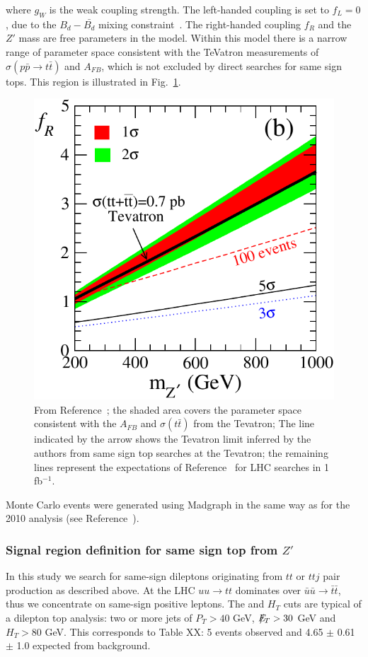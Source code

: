 where $g_W$ is the weak coupling strength. The left-handed coupling is set to $f_L = 0$, due 
to the $B_d-\bar{B_d}$ mixing constraint~\cite{Cao}. 
The right-handed coupling $f_R$ and the $Z'$ mass are free parameters in the model.
Within this model there is a narrow range of parameter space
consistent with the TeVatron measurements of $\sigma(p\bar{p} \to t\bar{t})$ 
and $A_{FB}$, which is not excluded by direct searches for same sign tops.
This region is illustrated in Fig.~\ref{fig:berger_limit}.


\begin{figure}[htb]
\begin{center}
\includegraphics[width=0.4\linewidth]{figs/berger_limit.pdf}
\caption{\protect From Reference~\cite{berger}; the shaded area covers the parameter
space consistent with the $A_{FB}$ and $\sigma(t\bar{t})$ from the Tevatron;
The line indicated by the arrow shows the Tevatron limit inferred by the authors
from same sign top searches at the Tevatron; the remaining lines represent the
expectations of Reference~\cite{berger}
for LHC searches in 1 fb$^{-1}$. \label{fig:berger_limit}}
\end{center}
\end{figure}

Monte Carlo events were generated using Madgraph in the same way as 
for the 2010 analysis (see Reference~\cite{ttAN}).



\subsubsection{Signal region definition for same sign top from $Z'$}
\label{sec:sstopsigdefinition}
In this study we search for same-sign dileptons originating from $tt$ 
or $ttj$ pair production as described above.  At the LHC $uu \to tt$ 
dominates over $\bar{u}\bar{u} \to \bar{t}\bar{t}$, thus we concentrate
on same-sign positive leptons.  The \met and $H_T$ cuts are typical 
of a dilepton top analysis: two or more jets of $P_T>40$ GeV, 
$E\!\!\!\!/_T > 30$ GeV and $H_T > 80$ GeV.  This corresponds to Table XX:
5 events observed and 4.65 $\pm$ 0.61 $\pm$ 1.0 expected from background.

